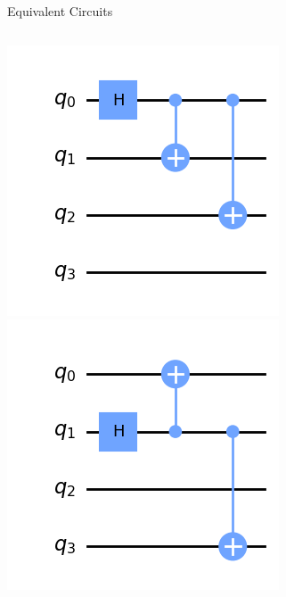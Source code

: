 \documentclass{beamer}
\begin{document}
\begin{frame}{Equivalent Circuits}
    \begin{columns}
        \centering
            \includegraphics[width=\columnwidth]{images/circ1.png}
        \centering
        \includegraphics[width=\columnwidth]{images/circ2.png}

\end{columns}
\end{frame}
\end{document}
